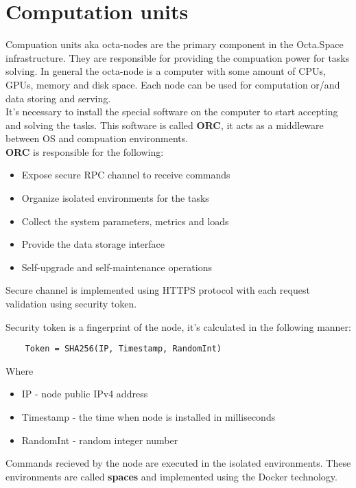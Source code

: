 \section{Computation units}

Compuation units aka octa-nodes are the primary component in the Octa.Space infrastructure.
They are responsible for providing the compuation power for tasks solving.
In general the octa-node is a computer with some amount of CPUs, GPUs, memory and disk space.
Each node can be used for computation or/and data storing and serving.
\\

It's necessary to install the special software on the computer to start accepting and solving the tasks.
This software is called \textbf{ORC}, it acts as a middleware between OS and compuation environments.
\\

\textbf{ORC} is responsible for the following:

\begin{itemize}
    \item Expose secure RPC channel to receive commands
    \item Organize isolated environments for the tasks
    \item Collect the system parameters, metrics and loads
    \item Provide the data storage interface
    \item Self-upgrade and self-maintenance operations
\end{itemize}


Secure channel is implemented using HTTPS\cite{https} protocol with each request validation using security token.

Security token is a fingerprint of the node, it's calculated in the following manner:

\begin{verbatim}
    Token = SHA256(IP, Timestamp, RandomInt)
\end{verbatim}

Where

\begin{itemize}
    \item IP - node public IPv4 address
    \item Timestamp - the time when node is installed in milliseconds
    \item RandomInt - random integer number
\end{itemize}

Commands recieved by the node are executed in the isolated environments.
These environments are called \textbf{spaces} and implemented using the Docker technology.

